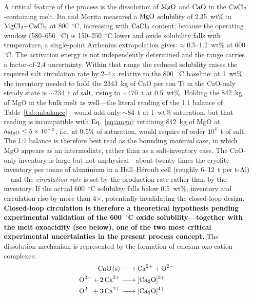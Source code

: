 \documentclass[pdflatex,sn-basic,Numbered]{sn-jnl}
\begin{document}
A critical feature of the process is the dissolution of $\ce{MgO}$ and $\ce{CaO}$ in the $\ce{CaCl2}$-containing melt. Ito and Morita \cite{morita2004} measured a $\ce{MgO}$ solubility of 2.35~wt\% in $\ce{MgCl2-CaCl2}$ at 800~$^{\circ}$C, increasing with $\ce{CaCl2}$ content; because the operating window (580--650~$^{\circ}$C) is 150--250~$^{\circ}$C lower and oxide solubility falls with temperature, a single-point Arrhenius extrapolation gives $\approx$0.5--1.2~wt\% at 600~$^{\circ}$C. The activation energy is not independently determined and the range carries a factor-of-2.4 uncertainty. Within that range the reduced solubility raises the required salt circulation rate by 2--4$\times$ relative to the 800~$^{\circ}$C baseline: at 1~wt\% the inventory needed to hold the 2343~kg of CaO per ton Ti in the CaO-only steady state is $\sim$234~t of salt, rising to $\sim$470~t at 0.5~wt\%. Holding the 842~kg of MgO in the bulk melt as well---the literal reading of the 1:1 balance of Table~\ref{tab:mbalance}---would add only $\sim$84~t at 1~wt\% saturation, but that reading is incompatible with Eq.~\ref{eq:amgo}: retaining 842~kg of MgO at $a_{\ce{MgO}} \le 5\times10^{-3}$, i.e.\ at 0.5\% of saturation, would require of order $10^4$~t of salt. The 1:1 balance is therefore best read as the bounding \emph{material} case, in which MgO appears as an intermediate, rather than as a salt-inventory case. The CaO-only inventory is large but not unphysical---about twenty times the cryolite inventory per tonne of aluminium in a Hall--H\'eroult cell (roughly 6--12~t per t-Al)---and the \emph{circulation rate} is set by the production rate rather than by the inventory. If the actual 600~$^{\circ}$C solubility falls below 0.5~wt\%, inventory and circulation rise by more than 4$\times$, potentially invalidating the closed-loop design. \textbf{Closed-loop circulation is therefore a theoretical hypothesis pending experimental validation of the 600~$^{\circ}$C oxide solubility---together with the melt oxoacidity (see below), one of the two most critical experimental uncertainties in the present process concept.} The dissolution mechanism is represented by the formation of calcium oxo-cation complexes:
\begin{align}
\ce{CaO(s) &-> Ca^{2+} + O^{2-}} \label{eq:diss1} \\
\ce{O^{2-} + 2Ca^{2+} &-> [Ca2O]^{2+}} \label{eq:diss2} \\
\ce{O^{2-} + 3Ca^{2+} &-> [Ca3O]^{4+}} \label{eq:diss3}
\end{align}
\end{document}
